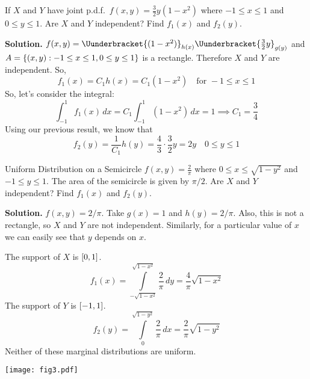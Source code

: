 \begin{Example}{}{}
    If $ X $ and $ Y $ have joint p.d.f.\
    $ \displaystyle  f(x,y)=\frac{3}{2} y(1-x^2) $
    where $ -1\le x\le 1 $ and $ 0\le y\le 1 $.
    Are $ X $ and $ Y $ independent? Find $ f_1(x) $ and $ f_2(y) $.

    \textbf{Solution.}
    $ f(x,y)=\Uunderbracket{(1-x^2)}_{h(x)} \Uunderbracket{\frac{3}{2} y}_{g(y)} $
    and $ A =\{(x,y):-1\le x\le 1,0\le y\le 1\} $
    is a rectangle. Therefore $ X $ and $ Y $ are independent. So,
    \[ f_1(x)=C_1h(x)=C_1(1-x^2)\quad\text{for }-1\le x\le 1 \]
    So, let's consider the integral:
    \[ \int_{-1}^{1} f_1(x)\, d{x} =C_1
        \int_{-1}^{1} (1-x^2)\, d{x} =1
        \implies C_1=\frac{3}{4} \]
    Using our previous result, we know that
    \[ f_2(y)=\frac{1}{C_1} h(y)=\frac{4}{3}\cdot \frac{3}{2} y=2y
        \quad 0\le y\le 1 \]
\end{Example}

\begin{Example}{Uniform Distribution on a Semicircle}{}
    $ \displaystyle f(x,y)=\frac{2}{\pi} $ where $ 0\le x\le \sqrt{1-y^2} $
    and $ -1\le y\le 1 $. The area of the semicircle
    is given by $ \pi/2 $. Are $ X $ and $ Y $ independent? Find
    $ f_1(x) $ and $ f_2(y) $.

    \begin{minipage}{0.7\textwidth}
        \textbf{Solution.} $ f(x,y)=2/\pi $.
        Take $ g(x)=1 $ and $ h(y)=2/\pi $. Also,
        this is not a rectangle, so $ X $ and $ Y $ are not independent.
        Similarly, for a particular value of $ x $
        we can easily see that $ y $ depends on $ x $.

        The support of $ X $ is $ \interval{0}{1} $.
        \[ f_1(x)=\int\limits_{-\sqrt{1-x^2}}^{\sqrt{1-x^2}} \frac{2}{\pi} \, d{y}=
            \frac{4}{\pi}\sqrt{1-x^2}  \]
        The support of $ Y $ is $ \interval{-1}{1} $.
        \[ f_2(y)=
            \int\limits_{0}^{\sqrt{1-y^2}} \frac{2}{\pi} \, d{x}=
            \frac{2}{\pi} \sqrt{1-y^2}  \]
        Neither of these marginal distributions are uniform.
    \end{minipage}
    \begin{minipage}{0.28\textwidth}
        \texttt{[image: fig3.pdf]}
    \end{minipage}
\end{Example}
